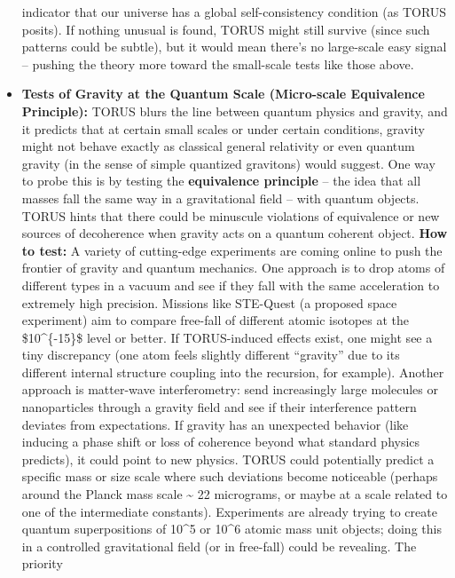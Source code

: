 \documentclass[
]{article}
\begin{document}
\begin{itemize}
  indicator that our universe has a global self-consistency condition
  (as TORUS posits). If nothing unusual is found, TORUS might still
  survive (since such patterns could be subtle), but it would mean
  there's no large-scale easy signal -- pushing the theory more toward
  the small-scale tests like those above.
\item
  \textbf{Tests of Gravity at the Quantum Scale (Micro-scale Equivalence
  Principle):} TORUS blurs the line between quantum physics and gravity,
  and it predicts that at certain small scales or under certain
  conditions, gravity might not behave exactly as classical general
  relativity or even quantum gravity (in the sense of simple quantized
  gravitons) would suggest. One way to probe this is by testing the
  \textbf{equivalence principle} -- the idea that all masses fall the
  same way in a gravitational field -- with quantum objects. TORUS hints
  that there could be minuscule violations of equivalence or new sources
  of decoherence when gravity acts on a quantum coherent object.
  \textbf{How to test:} A variety of cutting-edge experiments are coming
  online to push the frontier of gravity and quantum mechanics. One
  approach is to drop atoms of different types in a vacuum and see if
  they fall with the same acceleration to extremely high precision.
  Missions like STE-Quest (a proposed space experiment) aim to compare
  free-fall of different atomic isotopes at the \$10\^{}\{-15\}\$ level
  or better\hspace{0pt}. If TORUS-induced effects exist, one might see a
  tiny discrepancy (one atom feels slightly different ``gravity'' due to
  its different internal structure coupling into the recursion, for
  example). Another approach is matter-wave interferometry: send
  increasingly large molecules or nanoparticles through a gravity field
  and see if their interference pattern deviates from expectations. If
  gravity has an unexpected behavior (like inducing a phase shift or
  loss of coherence beyond what standard physics predicts), it could
  point to new physics. TORUS could potentially predict a specific mass
  or size scale where such deviations become noticeable (perhaps around
  the Planck mass scale \textasciitilde{} 22 micrograms, or maybe at a
  scale related to one of the intermediate constants). Experiments are
  already trying to create quantum superpositions of 10\^{}5 or 10\^{}6
  atomic mass unit objects; doing this in a controlled gravitational
  field (or in free-fall) could be revealing\hspace{0pt}. The priority

\end{itemize}
\end{document}
